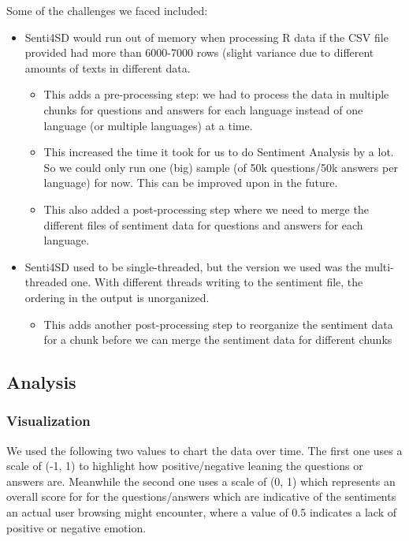 \documentclass[conference]{IEEEtran}
\begin{document}
Some of the challenges we faced included:
\begin{itemize}
    \item Senti4SD would run out of memory when processing R data if the CSV file provided had more than 6000-7000 rows (slight variance due to different amounts of texts in different data.
    \begin{itemize}
        \item This adds a pre-processing step: we had to process the data in multiple chunks for questions and answers for each language instead of one language (or multiple languages) at a time.
        \item This increased the time it took for us to do Sentiment Analysis by a lot. So we could only run one (big) sample (of 50k questions/50k answers per language) for now. This can be improved upon in the future.
        \item This also added a post-processing step where we need to merge the different files of sentiment data for questions and answers for each language.
    \end{itemize}
    \item Senti4SD used to be single-threaded, but the version we used was the multi-threaded one. With different threads writing to the sentiment file, the ordering in the output is unorganized. 
    \begin{itemize}
        \item This adds another post-processing step to reorganize the sentiment data for a chunk before we can merge the sentiment data for different chunks\\
    \end{itemize}
\end{itemize}

\subsection{Analysis}
\subsubsection{Visualization}
We used the following two values to chart the data over time. The first one uses a scale of (-1, 1) to highlight how positive/negative leaning the questions or answers are. Meanwhile the second one uses a scale of (0, 1) which represents an overall score for for the questions/answers which are indicative of the sentiments an actual user browsing might encounter, where a value of 0.5 indicates a lack of positive or negative emotion.
\end{document}

